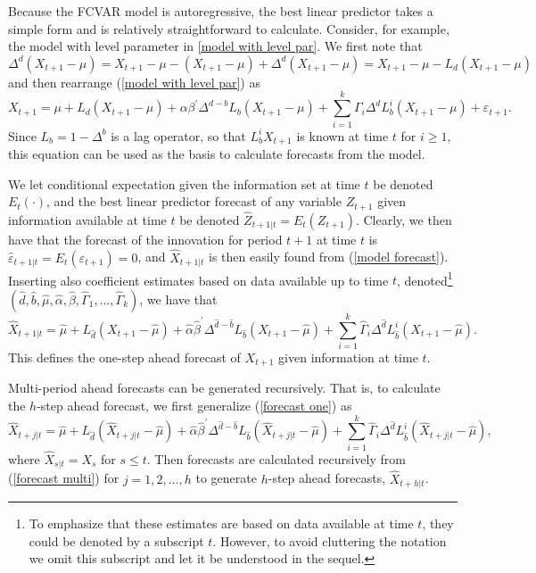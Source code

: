 \documentclass[article]{jss}
\begin{document}
Because the FCVAR model is autoregressive, the best linear predictor takes a simple form and is relatively straightforward to calculate. Consider, for example, the model with level parameter in \eqref{model with level par}. We first note that
\begin{equation}
\Delta^d (X_{t+1}-\mu) = X_{t+1}-\mu  - (X_{t+1}-\mu) + \Delta^d (X_{t+1}-\mu) = X_{t+1}-\mu - L_d (X_{t+1}-\mu)
\nonumber
\end{equation}
and then rearrange (\ref{model with level par}) as
\begin{equation}
X_{t+1}=\mu + L_d (X_{t+1}-\mu)+\alpha\beta^{\prime}\Delta^{d-b}L_{b}(X_{t+1}-\mu)+\sum
_{i=1}^{k}\Gamma_{i}\Delta^d L_{b}^{i}(X_{t+1}-\mu)+\varepsilon_{t+1}.
\label{model forecast}
\end{equation}
Since $L_{b}=1-\Delta^{b}$ is a lag operator, so that $L_{b}^{i}X_{t+1}$ is known at time $t$ for $i \geq 1$, this equation can be used as the basis to calculate forecasts from the model.

We let conditional expectation given the information set at time $t$ be denoted $E_{t}(\cdot)$, and the best linear predictor forecast of any variable $Z_{t+1}$ given information available at time $t$ be denoted $\hat{Z}_{t+1|t}=E_{t}(Z_{t+1})$. Clearly, we then have that the forecast of the innovation for period $t+1$ at time $t$ is $\hat{\varepsilon}_{t+1|t}=E_{t}(\varepsilon_{t+1})=0$, and $\hat{X}_{t+1|t}$ is then easily found from (\ref{model forecast}). Inserting also coefficient estimates based on data available up to time $t$, denoted\footnote{To emphasize that these estimates are based on data available at time $t$, they could be denoted by a subscript $t$. However, to avoid cluttering the notation we omit this subscript and let it be understood in the sequel.} $(\hat{d},\hat{b},\hat{\mu},\hat{\alpha},\hat{\beta },\hat{\Gamma}_{1},\ldots,\hat{\Gamma}_{k})$, we have that
\begin{equation}
\hat{X}_{t+1|t}=\hat{\mu}+L_{\hat{d}} (X_{t+1}-\hat{\mu})+\hat{\alpha}\hat{\beta}^{\prime}\Delta^{\hat{d}-\hat{b}
}L_{\hat{b}}(X_{t+1}-\hat{\mu})+\sum_{i=1}^{k}\hat{\Gamma}_{i}\Delta^{\hat{d}}
L_{\hat{b}}^{i}(X_{t+1}-\hat{\mu}).
\label{forecast one}
\end{equation}
This defines the one-step ahead forecast of $X_{t+1}$ given information at time $t$. 

Multi-period ahead forecasts can be generated recursively. That is, to calculate the $h$-step ahead forecast, we first generalize (\ref{forecast one}) as
\begin{equation}
\hat{X}_{t+j|t}=\hat{\mu}+L_{\hat{d}} (\hat{X}_{t+j|t}-\hat{\mu})+\hat{\alpha}\hat{\beta}^{\prime}
\Delta^{\hat{d}-\hat{b}}L_{\hat{b}}(\hat{X}_{t+j|t}-\hat{\mu})+\sum_{i=1}^{k}
\hat{\Gamma}_{i}\Delta^{\hat{d}} L_{\hat{b}}^{i}(\hat{X}_{t+j|t}-\hat{\mu}),
\label{forecast multi}
\end{equation}
where $\hat{X}_{s|t}=X_{s}$ for $s\leq t$. Then forecasts are calculated recursively from (\ref{forecast multi}) for $j=1,2,\ldots,h$ to generate $h$-step ahead forecasts, $\hat{X}_{t+h|t}$.
\end{document}
